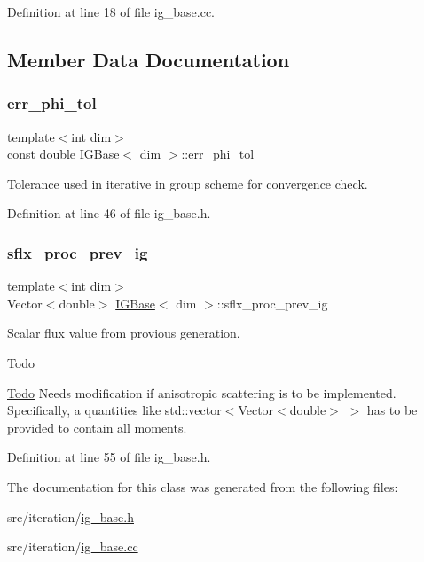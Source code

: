 Definition at line 18 of file ig\+\_\+base.\+cc.



\subsection{Member Data Documentation}
\mbox{\label{class_i_g_base_ace9461aa2cfc9dcc4455616d2d9d6049}} 
\subsubsection{\texorpdfstring{err\+\_\+phi\+\_\+tol}{err\_phi\_tol}}
{\footnotesize\ttfamily template$<$int dim$>$ \\
const double \hyperlink{class_i_g_base}{I\+G\+Base}$<$ dim $>$\+::err\+\_\+phi\+\_\+tol\hspace{0.3cm}{\ttfamily [protected]}}



Tolerance used in iterative in group scheme for convergence check. 



Definition at line 46 of file ig\+\_\+base.\+h.

\mbox{\label{class_i_g_base_a0a301d6077cb7c94ab0942ab3d5082a5}} 
\subsubsection{\texorpdfstring{sflx\+\_\+proc\+\_\+prev\+\_\+ig}{sflx\_proc\_prev\_ig}}
{\footnotesize\ttfamily template$<$int dim$>$ \\
Vector$<$double$>$ \hyperlink{class_i_g_base}{I\+G\+Base}$<$ dim $>$\+::sflx\+\_\+proc\+\_\+prev\+\_\+ig\hspace{0.3cm}{\ttfamily [protected]}}

Scalar flux value from provious generation.

\begin{DoxyRefDesc}{Todo}
\item[\hyperlink{todo__todo000003}{Todo}]Needs modification if anisotropic scattering is to be implemented. Specifically, a quantities like std\+::vector$<$Vector$<$double$>$ $>$ has to be provided to contain all moments. \end{DoxyRefDesc}


Definition at line 55 of file ig\+\_\+base.\+h.



The documentation for this class was generated from the following files\+:\begin{DoxyCompactItemize}
\item 
src/iteration/\hyperlink{ig__base_8h}{ig\+\_\+base.\+h}\item 
src/iteration/\hyperlink{ig__base_8cc}{ig\+\_\+base.\+cc}\end{DoxyCompactItemize}
